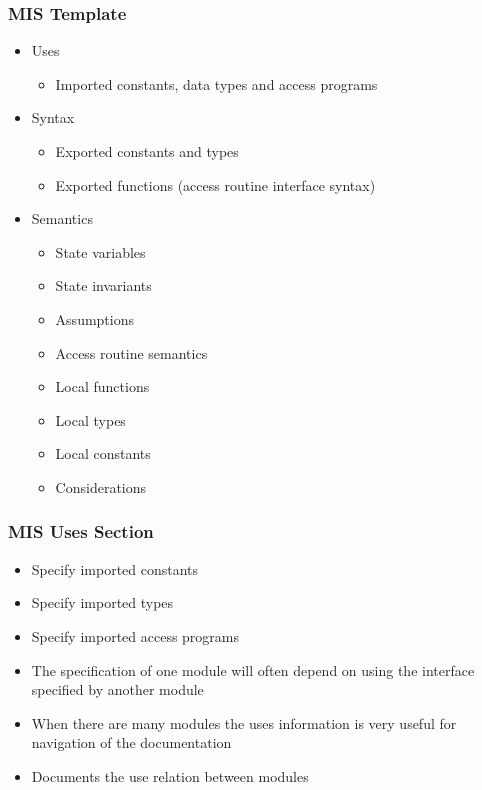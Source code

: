\documentclass[t, 12pt, numbers, fleqn, handout]{beamer}
\begin{document}

\begin{frame}
\frametitle{MIS Template}

\begin{itemize}
\item Uses
\begin{itemize}
\item Imported constants, data types and access programs
\end{itemize}
\item Syntax
\begin{itemize}
\item Exported constants and types
\item Exported functions (access routine interface syntax)
\end{itemize}
\item Semantics
\begin{itemize}
\item State variables
\item State invariants
\item Assumptions
\item Access routine semantics
\item Local functions
\item Local types
\item Local constants
\item Considerations
\end{itemize}
\end{itemize}
\end{frame}


\begin{frame}
\frametitle{MIS Uses Section}
\begin{itemize}
\item Specify imported constants
\item Specify imported types
\item Specify imported access programs
\item The specification of one module will often depend on using the interface specified by another module
\item When there are many modules the uses information is very useful for navigation of the documentation
\item Documents the use relation between modules
\end{itemize}
\end{frame}
\end{document}
